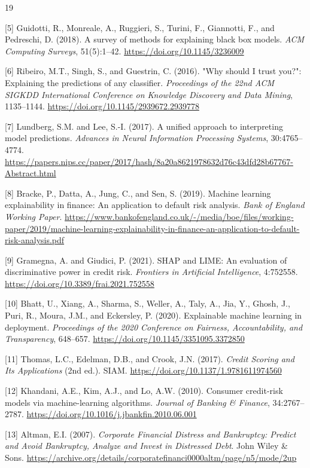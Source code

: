 \documentclass[a4 paper, 11pt,twoside]{article}
\newcommand{\0}{\Bf{0}}
\theoremstyle{definition}
\begin{document}
{\begin{thebibliography}{19}
{\label{ref5}[5] Guidotti, R., Monreale, A., Ruggieri, S., Turini, F., Giannotti, F., and Pedreschi, D. (2018). A survey of methods for explaining black box models. \emph{ACM Computing Surveys}, 51(5):1--42. \url{https://doi.org/10.1145/3236009}

\label{ref6}[6] Ribeiro, M.T., Singh, S., and Guestrin, C. (2016). "Why should I trust you?": Explaining the predictions of any classifier. \emph{Proceedings of the 22nd ACM SIGKDD International Conference on Knowledge Discovery and Data Mining}, 1135--1144. \url{https://doi.org/10.1145/2939672.2939778}

\label{ref7}[7] Lundberg, S.M. and Lee, S.-I. (2017). A unified approach to interpreting model predictions. \emph{Advances in Neural Information Processing Systems}, 30:4765--4774. \url{https://papers.nips.cc/paper/2017/hash/8a20a8621978632d76c43dfd28b67767-Abstract.html}

\label{ref8}[8] Bracke, P., Datta, A., Jung, C., and Sen, S. (2019). Machine learning explainability in finance: An application to default risk analysis. \emph{Bank of England Working Paper}. \url{https://www.bankofengland.co.uk/-/media/boe/files/working-paper/2019/machine-learning-explainability-in-finance-an-application-to-default-risk-analysis.pdf}

\label{ref9}[9] Gramegna, A. and Giudici, P. (2021). SHAP and LIME: An evaluation of discriminative power in credit risk. \emph{Frontiers in Artificial Intelligence}, 4:752558. \url{https://doi.org/10.3389/frai.2021.752558}

\label{ref10}[10] Bhatt, U., Xiang, A., Sharma, S., Weller, A., Taly, A., Jia, Y., Ghosh, J., Puri, R., Moura, J.M., and Eckersley, P. (2020). Explainable machine learning in deployment. \emph{Proceedings of the 2020 Conference on Fairness, Accountability, and Transparency}, 648--657. \url{https://doi.org/10.1145/3351095.3372850}

\label{ref11}[11] Thomas, L.C., Edelman, D.B., and Crook, J.N. (2017). \emph{Credit Scoring and Its Applications} (2nd ed.). SIAM. \url{https://doi.org/10.1137/1.9781611974560}

\label{ref12}[12] Khandani, A.E., Kim, A.J., and Lo, A.W. (2010). Consumer credit-risk models via machine-learning algorithms. \emph{Journal of Banking \& Finance}, 34:2767--2787. \url{https://doi.org/10.1016/j.jbankfin.2010.06.001}

\label{ref13}[13] Altman, E.I. (2007). \emph{Corporate Financial Distress and Bankruptcy: Predict and Avoid Bankruptcy, Analyze and Invest in Distressed Debt}. John Wiley \& Sons. \url{https://archive.org/details/corporatefinanci0000altm/page/n5/mode/2up}

}
\end{thebibliography}}
\end{document}
